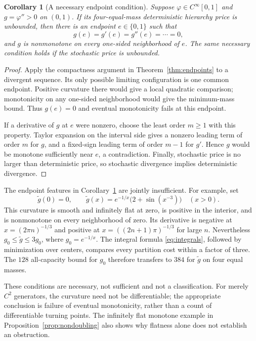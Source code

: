 \documentclass[11pt]{article}
\newtheorem{corollary}[theorem]{Corollary}
\theoremstyle{definition}\newtheorem{definition}[theorem]{Definition}
\theoremstyle{remark}\newtheorem{remark}[theorem]{Remark}
\newcommand{\ph}{\varphi}
\begin{document}
\begin{corollary}[A necessary endpoint condition]
\label{cor:necessary}
Suppose $\ph\in C^\infty[0,1]$ and $g=\ph''>0$ on $(0,1)$. If its four-equal-mass deterministic hierarchy price is unbounded, then there is an endpoint $e\in\{0,1\}$ such that
\[
g(e)=g'(e)=g''(e)=\cdots=0,
\]
and $g$ is nonmonotone on every one-sided neighborhood of $e$. The same necessary condition holds if the stochastic price is unbounded.
\end{corollary}
\begin{proof}
Apply the compactness argument in Theorem~\ref{thm:endpoints} to a divergent sequence. Its only possible limiting configuration is one common endpoint. Positive curvature there would give a local quadratic comparison; monotonicity on any one-sided neighborhood would give the minimum-mass bound. Thus $g(e)=0$ and eventual monotonicity fails at this endpoint.

If a derivative of $g$ at $e$ were nonzero, choose the least order $m\ge1$ with this property. Taylor expansion on the interval side gives a nonzero leading term of order $m$ for $g$, and a fixed-sign leading term of order $m-1$ for $g'$. Hence $g$ would be monotone sufficiently near $e$, a contradiction. Finally, stochastic price is no larger than deterministic price, so stochastic divergence implies deterministic divergence.
\end{proof}

The endpoint features in Corollary~\ref{cor:necessary} are jointly insufficient. For example, set
\[
\widetilde g(0)=0,\qquad
\widetilde g(x)=e^{-1/x}\bigl(2+\sin(x^{-3})\bigr)\quad(x>0).
\]
This curvature is smooth and infinitely flat at zero, is positive in the interior, and is nonmonotone on every neighborhood of zero. Its derivative is negative at $x=(2\pi n)^{-1/3}$ and positive at $x=((2n+1)\pi)^{-1/3}$ for large $n$. Nevertheless $g_0\le\widetilde g\le3g_0$, where $g_0=e^{-1/x}$. The integral formula \eqref{eq:integrals}, followed by minimization over centers, compares every partition cost within a factor of three. The $128$ all-capacity bound for $g_0$ therefore transfers to $384$ for $\widetilde g$ on four equal masses.

These conditions are necessary, not sufficient and not a classification. For merely $C^2$ generators, the curvature need not be differentiable; the appropriate conclusion is failure of eventual monotonicity, rather than a count of differentiable turning points. The infinitely flat monotone example in Proposition~\ref{prop:nondoubling} also shows why flatness alone does not establish an obstruction.
\end{document}
